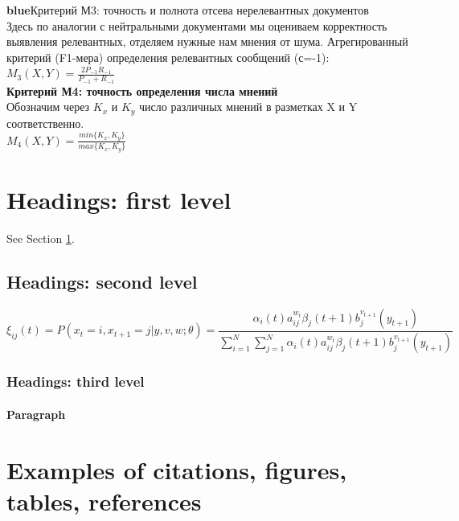 \documentclass{article}
\begin{document}
\textbf{blue}{Критерий М3: точность и полнота отсева нерелевантных документов}\\
Здесь по аналогии с нейтральными документами мы оцениваем корректность выявления релевантных, отделяем нужные нам мнения от шума. Агрегированный критерий (F1-мера) определения релевантных сообщений (с=-1):\\ 

\hspace{5cm}$M_3(X, Y) = \frac{2P_{-1}R_{-1}}{P_{-1}+R_{-1}}$\\

\textbf{Критерий М4: точность определения числа мнений}\\
Обозначим через $K_x$ и $K_y$ число различных мнений в разметках X и Y соответственно.\\

\hspace{5cm}$M_4(X, Y) = \frac{min\{K_x, K_y\}}{max\{K_x, K_y\}}$\\

\section{Headings: first level}
\label{sec:headings}

\lipsum[4] See Section \ref{sec:headings}.

\subsection{Headings: second level}
\lipsum[5]
\begin{equation}
	\xi _{ij}(t)=P(x_{t}=i,x_{t+1}=j|y,v,w;\theta)= {\frac {\alpha _{i}(t)a^{w_t}_{ij}\beta _{j}(t+1)b^{v_{t+1}}_{j}(y_{t+1})}{\sum _{i=1}^{N} \sum _{j=1}^{N} \alpha _{i}(t)a^{w_t}_{ij}\beta _{j}(t+1)b^{v_{t+1}}_{j}(y_{t+1})}}
\end{equation}

\subsubsection{Headings: third level}
\lipsum[6]

\paragraph{Paragraph}
\lipsum[7]



\section{Examples of citations, figures, tables, references}
\label{sec:others}
\end{document}
